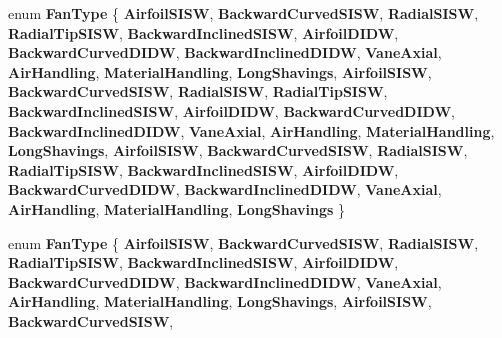 \begin{DoxyCompactItemize}
enum {\bfseries Fan\+Type} \{ \newline
{\bfseries Airfoil\+S\+I\+SW}, 
{\bfseries Backward\+Curved\+S\+I\+SW}, 
{\bfseries Radial\+S\+I\+SW}, 
{\bfseries Radial\+Tip\+S\+I\+SW}, 
\newline
{\bfseries Backward\+Inclined\+S\+I\+SW}, 
{\bfseries Airfoil\+D\+I\+DW}, 
{\bfseries Backward\+Curved\+D\+I\+DW}, 
{\bfseries Backward\+Inclined\+D\+I\+DW}, 
\newline
{\bfseries Vane\+Axial}, 
{\bfseries Air\+Handling}, 
{\bfseries Material\+Handling}, 
{\bfseries Long\+Shavings}, 
\newline
{\bfseries Airfoil\+S\+I\+SW}, 
{\bfseries Backward\+Curved\+S\+I\+SW}, 
{\bfseries Radial\+S\+I\+SW}, 
{\bfseries Radial\+Tip\+S\+I\+SW}, 
\newline
{\bfseries Backward\+Inclined\+S\+I\+SW}, 
{\bfseries Airfoil\+D\+I\+DW}, 
{\bfseries Backward\+Curved\+D\+I\+DW}, 
{\bfseries Backward\+Inclined\+D\+I\+DW}, 
\newline
{\bfseries Vane\+Axial}, 
{\bfseries Air\+Handling}, 
{\bfseries Material\+Handling}, 
{\bfseries Long\+Shavings}, 
\newline
{\bfseries Airfoil\+S\+I\+SW}, 
{\bfseries Backward\+Curved\+S\+I\+SW}, 
{\bfseries Radial\+S\+I\+SW}, 
{\bfseries Radial\+Tip\+S\+I\+SW}, 
\newline
{\bfseries Backward\+Inclined\+S\+I\+SW}, 
{\bfseries Airfoil\+D\+I\+DW}, 
{\bfseries Backward\+Curved\+D\+I\+DW}, 
{\bfseries Backward\+Inclined\+D\+I\+DW}, 
\newline
{\bfseries Vane\+Axial}, 
{\bfseries Air\+Handling}, 
{\bfseries Material\+Handling}, 
{\bfseries Long\+Shavings}
 \}
\item 
\mbox{\label{class_optimal_fan_efficiency_a468d7943ddcfc8678373762cd0641823}} 
enum {\bfseries Fan\+Type} \{ \newline
{\bfseries Airfoil\+S\+I\+SW}, 
{\bfseries Backward\+Curved\+S\+I\+SW}, 
{\bfseries Radial\+S\+I\+SW}, 
{\bfseries Radial\+Tip\+S\+I\+SW}, 
\newline
{\bfseries Backward\+Inclined\+S\+I\+SW}, 
{\bfseries Airfoil\+D\+I\+DW}, 
{\bfseries Backward\+Curved\+D\+I\+DW}, 
{\bfseries Backward\+Inclined\+D\+I\+DW}, 
\newline
{\bfseries Vane\+Axial}, 
{\bfseries Air\+Handling}, 
{\bfseries Material\+Handling}, 
{\bfseries Long\+Shavings}, 
\newline
{\bfseries Airfoil\+S\+I\+SW}, 
{\bfseries Backward\+Curved\+S\+I\+SW}, 

\end{DoxyCompactItemize}
